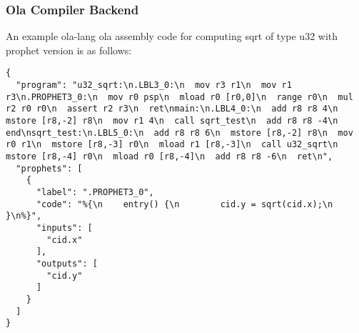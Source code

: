 \subsubsection{Ola Compiler Backend}

An example ola-lang ola assembly code for computing sqrt of type u32 with prophet version is as follows:
\begin{lstlisting}[language={}]
{
  "program": "u32_sqrt:\n.LBL3_0:\n  mov r3 r1\n  mov r1 r3\n.PROPHET3_0:\n  mov r0 psp\n  mload r0 [r0,0]\n  range r0\n  mul r2 r0 r0\n  assert r2 r3\n  ret\nmain:\n.LBL4_0:\n  add r8 r8 4\n  mstore [r8,-2] r8\n  mov r1 4\n  call sqrt_test\n  add r8 r8 -4\n  end\nsqrt_test:\n.LBL5_0:\n  add r8 r8 6\n  mstore [r8,-2] r8\n  mov r0 r1\n  mstore [r8,-3] r0\n  mload r1 [r8,-3]\n  call u32_sqrt\n  mstore [r8,-4] r0\n  mload r0 [r8,-4]\n  add r8 r8 -6\n  ret\n",
  "prophets": [
    {
      "label": ".PROPHET3_0",
      "code": "%{\n    entry() {\n        cid.y = sqrt(cid.x);\n    }\n%}",
      "inputs": [
        "cid.x"
      ],
      "outputs": [
        "cid.y"
      ]
    }
  ]
}
\end{lstlisting}

